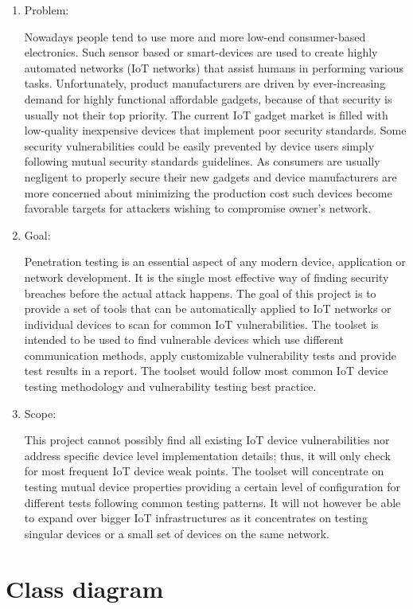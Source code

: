 \documentclass{article}
\begin{document}
\begin{enumerate}
	\item Problem:
	
	Nowadays people tend to use more and more low-end consumer-based electronics. Such sensor based or smart-devices are used to create highly automated networks (IoT networks) that assist humans in performing various tasks. Unfortunately, product manufacturers are driven by ever-increasing demand for highly functional affordable gadgets, because of that security is usually not their top priority. The current IoT gadget market is filled with low-quality inexpensive devices that implement poor security standards. Some security vulnerabilities could be easily prevented by device users simply following mutual security standards guidelines. As consumers are usually negligent to properly secure their new gadgets and device manufacturers are more concerned about minimizing the production cost such devices become favorable targets for attackers wishing to compromise owner’s network.
	\item Goal:
	
	Penetration testing is an essential aspect of any modern device, application or network development. It is the single most effective way of finding security breaches before the actual attack happens. The goal of this project is to provide a set of tools that can be automatically applied to IoT networks or individual devices to scan for common IoT vulnerabilities. The toolset is intended to be used to find vulnerable devices which use different communication methods, apply customizable vulnerability tests and provide test results in a report. The toolset would follow most common IoT device testing methodology and vulnerability testing best practice.
	\item Scope:
	
	This project cannot possibly find all existing IoT device vulnerabilities nor address specific device level implementation details; thus, it will only check for most frequent IoT device weak points. The toolset will concentrate on testing mutual device properties providing a certain level of configuration for different tests following common testing patterns. It will not however be able to expand over bigger IoT infrastructures as it concentrates on testing singular devices or a small set of devices on the same network.
\end{enumerate}


\section{Class diagram}\label{sec:appendix-class-diag}
\end{document}
